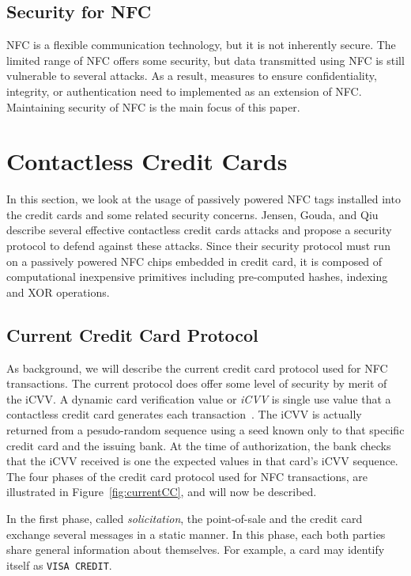\documentclass{sig-alternate}
\begin{document}
\subsection{Security for NFC}
\label{sec:backgroundSecurity}
NFC is a flexible communication technology, but it is not inherently secure. The limited range of NFC offers some security, but data transmitted using NFC is still vulnerable to several attacks. As a result, measures to ensure confidentiality, integrity, or authentication need to implemented as an extension of NFC. Maintaining security of NFC is the main focus of this paper.~\cite{CC2016}



\section{Contactless Credit Cards}
\label{sec:creditCard}
In this section, we look at the usage of passively powered NFC tags installed into the  credit cards and some related security concerns. Jensen, Gouda, and Qiu describe several effective contactless credit cards attacks and propose a security protocol to defend against these attacks. Since their security protocol must run on a passively powered NFC chips embedded in credit card, it is composed of computational inexpensive primitives including pre-computed hashes, indexing and XOR operations.~\cite{CC2016}


\subsection{Current Credit Card Protocol}
\label{sec:currentCC}
As background, we will describe the current credit card protocol used for NFC transactions. The current protocol does offer some level of security by merit of the iCVV. A dynamic card verification value or \textit{iCVV} is single use value that a contactless credit card generates each transaction~\cite{wiki:iCVV}. The iCVV is actually returned from a pesudo-random sequence using a seed known only to that specific credit card and the issuing bank. At the time of authorization, the bank checks that the iCVV received is one the expected values in that card's iCVV sequence. The four phases of the credit card protocol used for NFC transactions, are illustrated in Figure~\ref{fig:currentCC}, and will now be described.

In the first phase, called \textit{solicitation}, the point-of-sale and the credit card exchange several messages in a static manner. In this phase, each both parties share general information about themselves. For example, a card may identify itself as \texttt{VISA CREDIT}.
\end{document}
